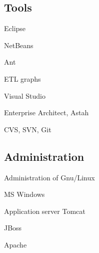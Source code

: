 \documentclass[czech]{article}
\renewenvironment{itemize}{
  \begin{list}{}{
    \setlength{\leftmargin}{1.5em}
  }
}{
  \end{list}
}
\begin{document}
\begin{multicols}{2}
\textcolor{coffee}{\subsection*{Tools}}
\begin{itemize}
\item Eclipse
\item NetBeans
\item Ant
\item ETL graphs
\item Visual Studio
\item Enterprise Architect, Astah
\item CVS, SVN, Git
\end{itemize}


\textcolor{coffee}{\subsection*{Administration}}
\begin{itemize}
  \item Administration of Gnu/Linux
  
  \item MS Windows
  
  \item Application server Tomcat
  \item JBoss
  \item Apache
  \item 
\end{itemize}
\end{multicols}
\end{document}
